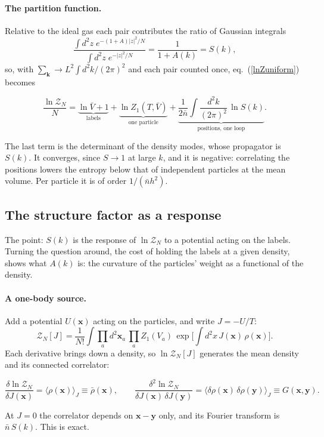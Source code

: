 \documentclass[11pt,aps,preprint,nofootinbib,superscriptaddress,tightenlines]{revtex4-2}
\newcommand{\avg}[1]{\langle #1\rangle}
\def\st{\begin{equation}}
\def\stp{\end{equation}}
\def\Eq#1{eq.~(\ref{#1})}
\let\oldparagraph\paragraph
\renewcommand{\paragraph}{\par\bigskip\oldparagraph}
\begin{document}
\paragraph{The partition function.}  Relative to the ideal gas each pair contributes the ratio of Gaussian integrals
\st
\frac{\int d^2z\;e^{-(1+A)|z|^2/N}}{\int d^2z\;e^{-|z|^2/N}}=\frac1{1+A(k)}=S(k),
\stp
so, with $\sum_{\bm k}\to L^2\int d^2k/(2\pi)^2$ and each pair counted once, \Eq{lnZuniform} becomes
\begin{keyeq}
\st
\frac{\ln\mathcal Z_N}N=\underbrace{\ln\bar V+1}_{\text{labels}}+\underbrace{\ln Z_1(T,\bar V)}_{\text{one particle}}
+\underbrace{\frac1{2\bar n}\int\frac{d^2k}{(2\pi)^2}\,\ln S(k)}_{\text{positions, one loop}} .
\label{lnZN}
\stp
\end{keyeq}
The last term is the determinant of the density modes, whose propagator is $S(k)$.  It converges, since $S\to1$ at large $k$, and it is negative:
correlating the positions lowers the entropy below that of independent particles at the mean volume.  Per particle it is of order $1/(\bar nh^2)$.

\subsection{The structure factor as a response}
\label{sec:response}

The point: $S(k)$ is the response of $\ln\mathcal Z_N$ to a potential acting on the labels.  Turning the question around, the cost of holding the labels at
a given density, shows what $A(k)$ is: the curvature of the particles' weight as a functional of the density.

\paragraph{A one-body source.}  Add a potential $U(\bm x)$ acting on the particles, and write $J=-U/T$:
\st
\mathcal Z_N[J]=\frac1{N!}\int\prod_ad^2\bm x_a\,\prod_aZ_1(V_a)\,\exp\Big[\int d^2x\,J(\bm x)\,\rho(\bm x)\Big] .
\stp
Each derivative brings down a density, so $\ln\mathcal Z_N[J]$ generates the mean density and its connected correlator:
\begin{keyeq}
\st
\frac{\delta\ln\mathcal Z_N}{\delta J(\bm x)}=\avg{\rho(\bm x)}_J\equiv\bar\rho(\bm x),\qquad
\frac{\delta^2\ln\mathcal Z_N}{\delta J(\bm x)\,\delta J(\bm y)}=\avg{\delta\rho(\bm x)\,\delta\rho(\bm y)}_J\equiv G(\bm x,\bm y) .
\label{Ssource}
\stp
\end{keyeq}
At $J=0$ the correlator depends on $\bm x-\bm y$ only, and its Fourier transform is $\bar n\,S(k)$.  This is exact.
\end{document}
